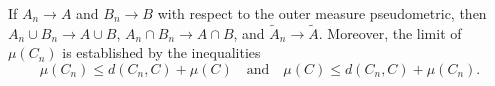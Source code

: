 If $A_n \to A$ and $B_n \to B$ with respect to the outer measure pseudometric, then $A_n \cup B_n \to A \cup B$, $A_n \cap B_n \to A \cap B$, and $\tilde{A}_n \to \tilde{A}$. Moreover, the limit of $\mu(C_n)$ is established by the inequalities
$$\mu(C_n) \leq d(C_n, C) + \mu(C) \quad \text{and} \quad \mu(C) \leq d(C_n, C) + \mu(C_n).$$
